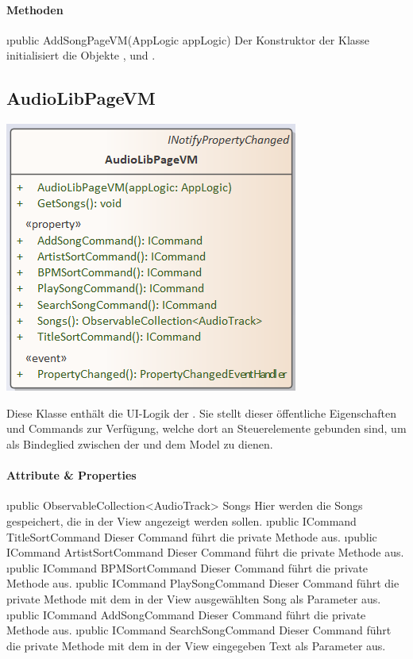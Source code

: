 \documentclass[../entwurf.tex]{subfiles}
\begin{document}
\paragraph{Methoden}
\begin{itemize}
	\i{public AddSongPageVM(AppLogic appLogic)} Der Konstruktor der Klasse initialisiert die Objekte ,  und .
\end{itemize}
\subsection{AudioLibPageVM}
\begin{minipage}{0.55\textwidth}
\includegraphics[scale=0.75]{../graphics/vm_klassen/AudioLibPageVM.png}
\end{minipage}
\begin{minipage}{0.45\textwidth}
Diese Klasse enthält die UI-Logik der . Sie stellt dieser öffentliche Eigenschaften und Commands zur Verfügung, welche dort an Steuerelemente gebunden sind, um als Bindeglied zwischen der  und dem Model zu dienen.
\end{minipage}
\paragraph{Attribute \& Properties}
\begin{itemize}
	\i{public ObservableCollection<AudioTrack> Songs} Hier werden die Songs gespeichert, die in der View angezeigt werden sollen.
	\i{public ICommand TitleSortCommand} Dieser Command führt die private Methode  aus. 
	\i{public ICommand ArtistSortCommand} Dieser Command führt die private Methode  aus. 
	\i{public ICommand BPMSortCommand} Dieser Command führt die private Methode  aus. 
	\i{public ICommand PlaySongCommand} Dieser Command führt die private Methode  mit dem in der View ausgewählten Song als Parameter aus. 
	\i{public ICommand AddSongCommand} Dieser Command führt die private Methode  aus. 
	\i{public ICommand SearchSongCommand} Dieser Command führt die private Methode  mit dem in der View eingegeben Text als Parameter aus. 
\end{itemize}
\end{document}
